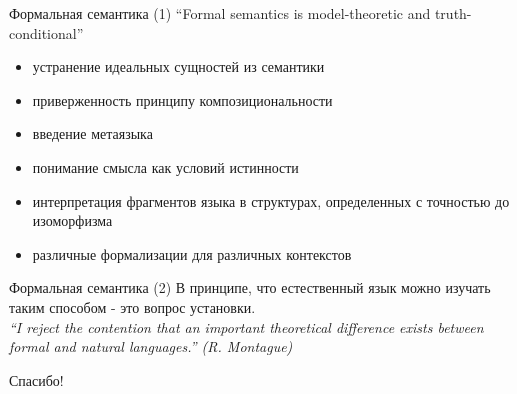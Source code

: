\documentclass{beamer}
\begin{document}
\begin{frame}{Формальная семантика (1)}
``Formal semantics is model-theoretic and truth-conditional''\\
\bigskip
  \begin{itemize}
    \item устранение идеальных сущностей из семантики
    \item приверженность принципу композициональности
    \item введение метаязыка
    \item понимание смысла как условий истинности
    \item интерпретация фрагментов языка в структурах, определенных с точностью до изоморфизма
    \item различные формализации для различных контекстов
  \end{itemize}
\end{frame}

\begin{frame}{Формальная семантика (2)}
В принципе, что естественный язык можно изучать таким способом - это вопрос установки.\\
\bigskip
\textit{``I reject the contention that an important theoretical difference exists between formal and natural languages.'' (R. Montague) }
\end{frame}


\begin{frame}{}
    \thispagestyle{empty}
    \begin{center}
        {\large Спасибо!}
    \end{center}
\end{frame}


\end{document}
